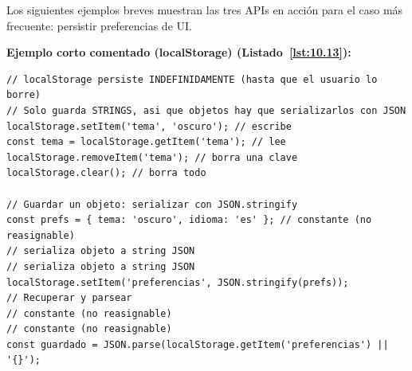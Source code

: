 Los siguientes ejemplos breves muestran las tres APIs en
acción para el caso más frecuente: persistir preferencias de UI.

\textbf{Ejemplo corto comentado (localStorage) (Listado~\ref{lst:10.13}):}
\begin{lstlisting}[style=js,numbers=none,caption={Ejemplo de JavaScript},label=lst:10.13]
// localStorage persiste INDEFINIDAMENTE (hasta que el usuario lo borre)
// Solo guarda STRINGS, asi que objetos hay que serializarlos con JSON
localStorage.setItem('tema', 'oscuro'); // escribe
const tema = localStorage.getItem('tema'); // lee
localStorage.removeItem('tema'); // borra una clave
localStorage.clear(); // borra todo

// Guardar un objeto: serializar con JSON.stringify
const prefs = { tema: 'oscuro', idioma: 'es' }; // constante (no reasignable)
// serializa objeto a string JSON
// serializa objeto a string JSON
localStorage.setItem('preferencias', JSON.stringify(prefs));
// Recuperar y parsear
// constante (no reasignable)
// constante (no reasignable)
const guardado = JSON.parse(localStorage.getItem('preferencias') || '{}');
\end{lstlisting}


